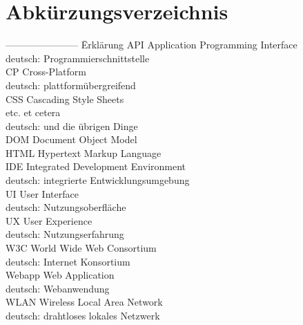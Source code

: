 \documentclass[a4paper]{scrartcl}
\begin{document}
\newpage

\section*{Abkürzungsverzeichnis}


\begin{tabbing}
	----------------------- \= Erklärung \kill
	API \> Application Programming Interface \\
	\> deutsch: Programmierschnittstelle \\
	CP \> Cross-Platform \\
	\> deutsch: plattformübergreifend \\
	CSS \> Cascading Style Sheets \\
	etc. \> et cetera \\
	\> deutsch: und die übrigen Dinge \\
	DOM \> Document Object Model \\
	HTML \> Hypertext Markup Language \\
	IDE \> Integrated Development Environment \\
	\> deutsch: integrierte Entwicklungsumgebung \\
	UI \> User Interface \\
	\> deutsch: Nutzungsoberfläche \\
	UX \> User Experience \\
	\> deutsch: Nutzungserfahrung \\
	W3C \> World Wide Web Consortium \\
	\> deutsch: Internet Konsortium \\
	Webapp \> Web Application \\
	\> deutsch: Webanwendung \\
	WLAN \> Wireless Local Area Network \\
	\> deutsch: drahtloses lokales Netzwerk \\
	
\end{tabbing}


\newpage

\listoffigures


\newpage

\listoftables
\end{document}
